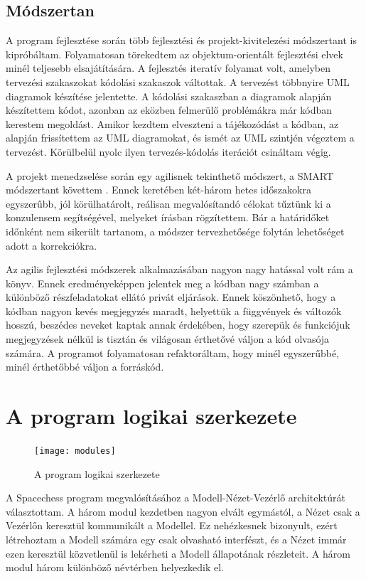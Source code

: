 \documentclass[12pt, twoside]{report}
\begin{document}
\subsection{Módszertan}

A program fejlesztése során több fejlesztési és projekt-kivitelezési módszertant is kipróbáltam. Folyamatosan törekedtem az objektum-orientált fejlesztési elvek minél teljesebb elsajátítására. A fejlesztés iteratív folyamat volt, amelyben tervezési szakaszokat kódolási szakaszok váltottak. A tervezést többnyire UML diagramok készítése jelentette. A kódolási szakaszban a diagramok alapján készítettem kódot, azonban az eközben felmerülő problémákra már kódban kerestem megoldást. Amikor kezdtem elveszteni a tájékozódást a kódban, az alapján frissítettem az UML diagramokat, és ismét az UML szintjén végeztem a tervezést. Körülbelül nyolc ilyen tervezés-kódolás iterációt csináltam végig.

A projekt menedzselése során egy agilisnek tekinthető módszert, a SMART módszertant követtem \cite{smart}. Ennek keretében két-három hetes időszakokra egyszerűbb, jól körülhatárolt, reálisan megvalósítandó célokat tűztünk ki a konzulensem segítségével, melyeket írásban rögzítettem. Bár a határidőket időnként nem sikerült tartanom, a módszer tervezhetősége folytán lehetőséget adott a korrekciókra.

Az agilis fejlesztési módszerek alkalmazásában nagyon nagy hatással volt rám a \cite{cleancode} könyv. Ennek eredményeképpen jelentek meg a kódban nagy számban a különböző részfeladatokat ellátó privát eljárások. Ennek köszönhető, hogy a kódban nagyon kevés megjegyzés maradt, helyettük a függvények és változók hosszú, beszédes neveket kaptak annak érdekében, hogy szerepük és funkciójuk megjegyzések nélkül is tisztán és világosan érthetővé váljon a kód olvasója számára. A programot folyamatosan refaktoráltam, hogy minél egyszerűbbé, minél érthetőbbé váljon a forráskód.

\section{A program logikai szerkezete}

\begin{figure}
	\begin{center}
		\texttt{[image: modules]}
	\end{center}
	\caption{A program logikai szerkezete}
\end{figure}


A Spacechess program megvalósításához a Modell-Nézet-Vezérlő architektúrát választottam. A három modul kezdetben nagyon elvált egymástól, a Nézet csak a Vezérlőn keresztül kommunikált a Modellel. Ez nehézkesnek bizonyult, ezért létrehoztam a Modell számára egy csak olvasható interfészt, és a Nézet immár ezen keresztül közvetlenül is lekérheti a Modell állapotának részleteit. A három modul három különböző névtérben helyezkedik el.
\end{document}
